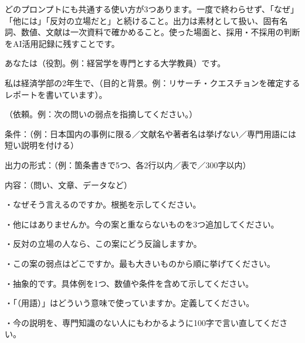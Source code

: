 どのプロンプトにも共通する使い方が3つあります。一度で終わらせず、「なぜ」「他には」「反対の立場だと」と続けること。出力は素材として扱い、固有名詞、数値、文献は一次資料で確かめること。使った場面と、採用・不採用の判断をAI活用記録に残すことです。


\begin{promptbox}
あなたは（役割。例：経営学を専門とする大学教員）です。

私は経済学部の2年生で、（目的と背景。例：リサーチ・クエスチョンを確定するレポートを書いています）。

（依頼。例：次の問いの弱点を指摘してください。）

条件：（例：日本国内の事例に限る／文献名や著者名は挙げない／専門用語には短い説明を付ける）

出力の形式：（例：箇条書きで5つ、各2行以内／表で／300字以内）

内容：（問い、文章、データなど）
\end{promptbox}

\begin{promptbox}
・なぜそう言えるのですか。根拠を示してください。

・他にはありませんか。今の案と重ならないものを3つ追加してください。

・反対の立場の人なら、この案にどう反論しますか。

・この案の弱点はどこですか。最も大きいものから順に挙げてください。

・抽象的です。具体例を1つ、数値や条件を含めて示してください。

・「（用語）」はどういう意味で使っていますか。定義してください。

・今の説明を、専門知識のない人にもわかるように100字で言い直してください。
\end{promptbox}

